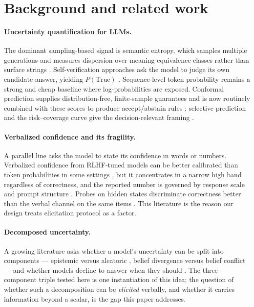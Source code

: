 \documentclass[11pt]{article}
\begin{document}
\section{Background and related work}
\label{sec:related}

\paragraph{Uncertainty quantification for LLMs.}
The dominant sampling-based signal is semantic entropy, which samples multiple generations and
measures dispersion over meaning-equivalence classes rather than surface strings
\citep{kuhn2023semantic,farquhar2024detecting}. Self-verification approaches ask the model to
judge its own candidate answer, yielding $P(\text{True})$ \citep{kadavath2022know}.
Sequence-level token probability remains a strong and cheap baseline where log-probabilities are
exposed. Conformal prediction supplies distribution-free, finite-sample guarantees and is now
routinely combined with these scores to produce accept/abstain rules
\citep{angelopoulos2021gentle,acse2026}; selective prediction and the risk--coverage curve give
the decision-relevant framing \citep{geifman2017selective}.

\paragraph{Verbalized confidence and its fragility.}
A parallel line asks the model to state its confidence in words or numbers. Verbalized confidence
from RLHF-tuned models can be better calibrated than token probabilities in some settings
\citep{tian2023just}, but it concentrates in a narrow high band regardless of correctness, and the
reported number is governed by response scale and prompt structure
\citep{xiong2024can,protocolsens2026}. Probes on hidden states discriminate correctness better
than the verbal channel on the same items \citep{ahdritz2024distinguishing}. This literature is
the reason our design treats elicitation protocol as a factor.

\paragraph{Decomposed uncertainty.}
A growing literature asks whether a model's uncertainty can be split into components ---
epistemic versus aleatoric \citep{ahdritz2024distinguishing}, belief divergence versus belief
conflict \citep{shi2026notall} --- and whether models decline to answer when they should
\citep{know2guess2026}. The three-component triple tested here is one instantiation of this
idea; the question of whether such a decomposition can be \emph{elicited} verbally, and whether it
carries information beyond a scalar, is the gap this paper addresses.
\end{document}
